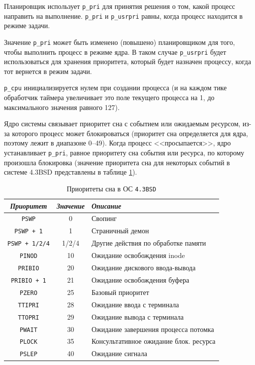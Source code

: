 Планировщик использует \texttt{р\_рri} для принятия решения о том, какой процесс направить на выполнение. \texttt{p\_pri} и \texttt{p\_usrpri} равны, когда процесс находится в режиме задачи.

Значение \texttt{p\_pri} может быть изменено (повышено) планировщиком для того, чтобы выполнить процесс в режиме ядра. В таком случае \texttt{p\_usrpri} будет использоваться для хранения приоритета, который будет назначен процессу, когда тот вернется в режим задачи.

\texttt{p\_cpu} инициализируется нулем при создании процесса (и на каждом тике обработчик таймера увеличивает это поле текущего процесса на 1, до максимального значения равного 127).

Ядро системы связывает приоритет сна с событием или ожидаемым ресурсом, из-за которого процесс может блокироваться (приоритет сна определяется для ядра, поэтому лежит в диапазоне 0--49). Когда процесс <<просыпается>>, ядро устанавливает \texttt{p\_pri}, равное приоритету сна события или ресурса, по которому произошла блокировка (значение приоритета сна для некоторых событий в системе 4.3BSD представлены в таблице \ref{tab:bsd}).


\begin{table}[h!]
	\caption{Приоритеты сна в ОС \texttt{4.3BSD}}
	\label{tab:bsd}
		\begin{tabularx}{\textwidth}{|c|c|X|}
			\hline
			\textit{Приоритет} & \textit{Значение} & \textit{Описание} \\
			\hline
			\texttt{PSWP} & 0 & Свопинг \\
			\hline
			\texttt{PSWP + 1} & 1 & Страничный демон \\
			\hline
			\texttt{PSWP + 1/2/4} & 1/2/4 & Другие действия по обработке памяти \\
			\hline
			\texttt{PINOD} & 10 & Ожидание освобождения inode \\
			\hline
			\texttt{PRIBIO} & 20 & Ожидание дискового ввода-вывода \\
			\hline
			\texttt{PRIBIO + 1} & 21 & Ожидание освобождения буфера \\
			\hline
			\texttt{PZERO} & 25 & Базовый приоритет \\
			\hline
			\texttt{TTIPRI} & 28 & Ожидание ввода с терминала \\
			\hline
			\texttt{TTOPRI} & 29 & Ожидание вывода с терминала \\
			\hline 
			\texttt{PWAIT} & 30 & Ожидание завершения процесса потомка \\
			\hline
			\texttt{PLOCK} & 35 & Консультативное ожидание блок. ресурса \\
			\hline
			\texttt{PSLEP} & 40 & Ожидание сигнала \\
			\hline
		\end{tabularx}
\end{table}

